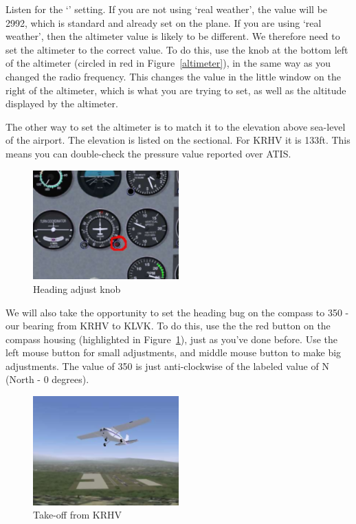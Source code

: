 Listen for the `' setting. If you are not using `real weather', the value will be 2992, which is standard and already set on the plane. If you are using `real weather', then the altimeter value is likely to be different. We therefore need to set the altimeter to the correct value. To do this, use the knob at the bottom left of the altimeter (circled in red in Figure~\ref{altimeter}), in the same way as you changed the radio frequency. This changes the value in the little window on the right of the altimeter, which is what you are trying to set, as well as the altitude displayed by the altimeter.

The other way to set the altimeter is to match it to the elevation above sea-level of the airport. The elevation is listed on the sectional. For KRHV it is 133ft. This means you can double-check the pressure value reported over ATIS.

\begin{figure}[!htp]
\centering
\includegraphics[width=0.5\textwidth]{compass}
\caption{Heading adjust knob\label{head}}
\end{figure}

We will also take the opportunity to set the heading bug on the compass to 350 - our bearing from KRHV to KLVK. To do this, use the the red button on the compass housing (highlighted in Figure~\ref{head}), just as you've done before. Use the left mouse button for small adjustments, and middle mouse button to make big adjustments. The value of 350 is just anti-clockwise of the labeled value of N (North - 0 degrees).

\begin{figure}[!htp]
\centering
\includegraphics[width=0.5\textwidth]{takeoff}
\caption{Take-off from KRHV}
\end{figure}

